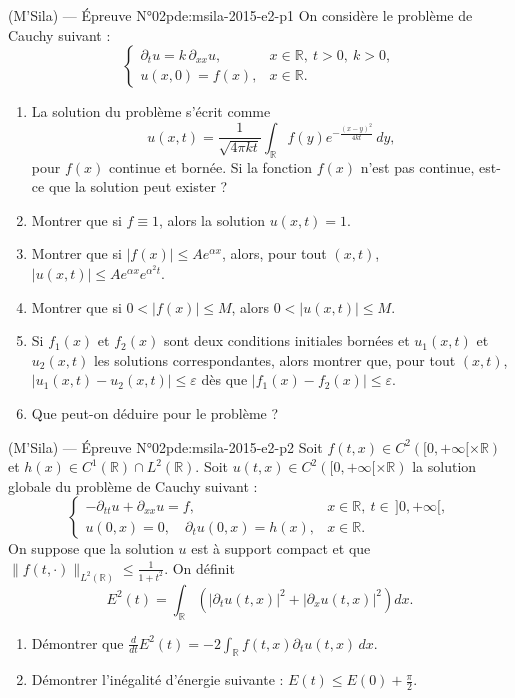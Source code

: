 \newpage
\begin{problem}{(M'Sila) — Épreuve N°02}{pde:msila-2015-e2-p1}
On considère le problème de Cauchy suivant :
$$\begin{cases}\partial_tu=k\,\partial_{xx}u, & x\in\mathbb{R},\ t>0,\ k>0,\\ u(x,0)=f(x), & x\in\mathbb{R}.\end{cases}$$
\begin{enumerate}\item La solution du problème s'écrit comme
$$u(x,t)=\frac{1}{\sqrt{4\pi kt}}\int_{\mathbb{R}}f(y)e^{-\frac{(x-y)^2}{4kt}}\,dy,$$
pour $f(x)$ continue et bornée. Si la fonction $f(x)$ n'est pas continue, est-ce que la solution peut exister ?\item Montrer que si $f\equiv1$, alors la solution $u(x,t)=1$.\item Montrer que si $\lvert f(x)\rvert\leq Ae^{\alpha x}$, alors, pour tout $(x,t)$, $\lvert u(x,t)\rvert\leq Ae^{\alpha x}e^{\alpha^2t}$.\item Montrer que si $0<\lvert f(x)\rvert\leq M$, alors $0<\lvert u(x,t)\rvert\leq M$.\item Si $f_1(x)$ et $f_2(x)$ sont deux conditions initiales bornées et $u_1(x,t)$ et $u_2(x,t)$ les solutions correspondantes, alors montrer que, pour tout $(x,t)$, $\lvert u_1(x,t)-u_2(x,t)\rvert\leq\varepsilon$ dès que $\lvert f_1(x)-f_2(x)\rvert\leq\varepsilon$.\item Que peut-on déduire pour le problème ?\end{enumerate}
\end{problem}
\newpage
\begin{problem}{(M'Sila) — Épreuve N°02}{pde:msila-2015-e2-p2}
Soit $f(t,x)\in C^2\left([0,+\infty[\times\mathbb{R}\right)$ et $h(x)\in C^1(\mathbb{R})\cap L^2(\mathbb{R})$. Soit $u(t,x)\in C^2\left([0,+\infty[\times\mathbb{R}\right)$ la solution globale du problème de Cauchy suivant :
$$\begin{cases}-\partial_{tt}u+\partial_{xx}u=f, & x\in\mathbb{R},\ t\in\,]0,+\infty[,\\ u(0,x)=0,\quad\partial_tu(0,x)=h(x), & x\in\mathbb{R}.\end{cases}$$
On suppose que la solution $u$ est à support compact et que $\lVert f(t,\cdot)\rVert_{L^2(\mathbb{R})}\leq\frac{1}{1+t^2}$. On définit
$$E^2(t)=\int_{\mathbb{R}}\left(\lvert\partial_tu(t,x)\rvert^2+\lvert\partial_xu(t,x)\rvert^2\right)dx.$$
\begin{enumerate}\item Démontrer que $\frac{d}{dt}E^2(t)=-2\int_{\mathbb{R}}f(t,x)\partial_tu(t,x)\,dx$.\item Démontrer l'inégalité d'énergie suivante : $E(t)\leq E(0)+\frac{\pi}{2}$.\end{enumerate}
\end{problem}
